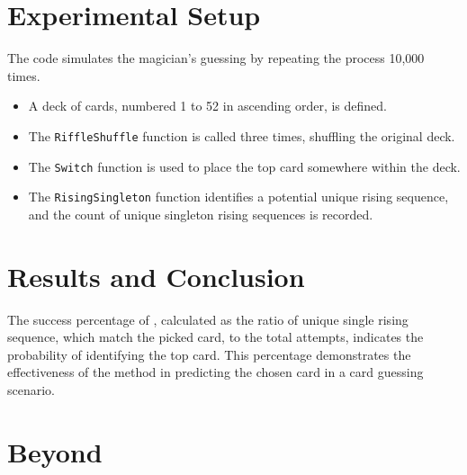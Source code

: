 \documentclass[a4paper]{article}
\begin{document}
\section{Experimental Setup}
The code simulates the magician's guessing by repeating the process 10,000 times.
\begin{itemize}
    \item A deck of cards, numbered 1 to 52 in ascending order, is defined.
    \item The \texttt{RiffleShuffle} function is called three times, shuffling the original
deck.
\item The \texttt{Switch} function is used to place the top card somewhere
within the deck.
\item The \texttt{RisingSingleton} function identifies a potential unique rising sequence, and the count of unique singleton rising sequences is recorded.

\end{itemize}

\section{ Results and Conclusion}
The success percentage of , calculated as the ratio of unique single rising sequence, which match the picked card, to the total attempts, indicates the probability of identifying
the top card. This percentage demonstrates the effectiveness of the method in
predicting the chosen card in a card guessing scenario.\newline
\newline 
\section{Beyond}
\end{document}
